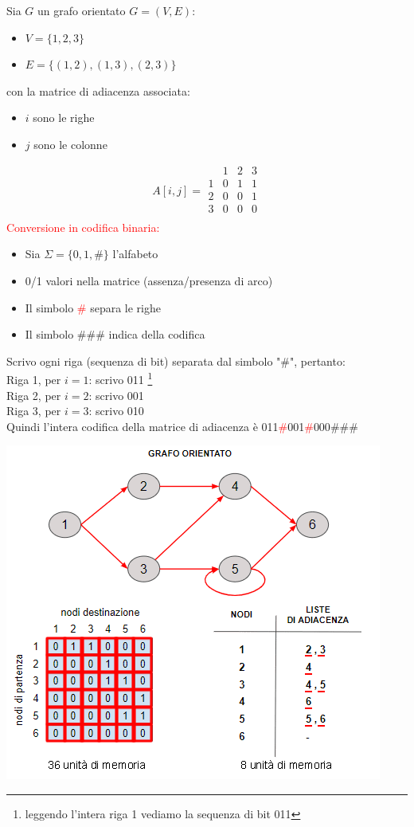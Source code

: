 \documentclass{article}  %
\theoremstyle{definition}
\begin{document}
\begin{esempio}
	\footnotesize
	Sia $G$ un grafo orientato $G=(V,E)$:
	\begin{itemize}
		\item $V = \{1, 2, 3\}$
		\item $E = \{(1,2), (1,3), (2,3)\}$
	\end{itemize}
	con la matrice di adiacenza associata:
	\begin{itemize}
		\item $i$ sono le righe
		\item $j$ sono le colonne
	\end{itemize}
	\[
		A[i,j] =
		\begin{array}{c|ccc}
			  & 1 & 2 & 3 \\ \hline
			1 & 0 & 1 & 1 \\
			2 & 0 & 0 & 1 \\
			3 & 0 & 0 & 0 \\
		\end{array}
	\]
	\textcolor{red}{Conversione in codifica binaria:}
	\begin{itemize}
		\item Sia $\Sigma = \{0, 1, \#\}$ l'alfabeto
		\item 0/1 valori nella matrice (assenza/presenza di arco)
		\item Il simbolo \textcolor{red}{$\#$} separa le righe
		\item Il simbolo $\#\#\#$ indica della codifica
	\end{itemize}
	Scrivo ogni riga (sequenza di bit) separata dal simbolo "\#", pertanto: \\
	Riga 1, per $i=1$: scrivo 011 \footnote{leggendo l'intera riga 1 vediamo la sequenza di bit 011} \\
	Riga 2, per $i=2$: scrivo 001 \\
	Riga 3, per $i=3$: scrivo 010 \\
	Quindi l'intera codifica della matrice di adiacenza è 011\textcolor{red}{\#}001\textcolor{red}{\#}000$\#\#\#$
\end{esempio}
\begin{center}
	\includegraphics[width=0.7\linewidth]{lista-matrice-adiacenza-grafi.png}
\end{center}
\end{document}
